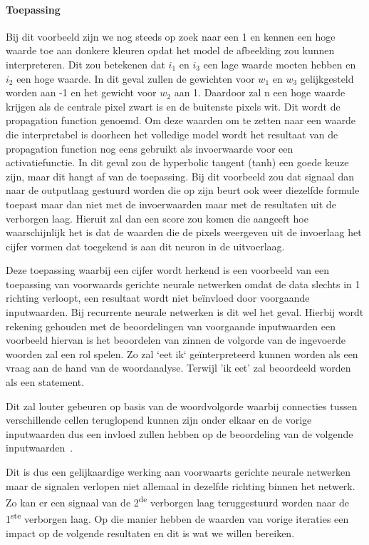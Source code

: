 \paragraph{Toepassing}
Bij dit voorbeeld zijn we nog steeds op zoek naar een 1 en kennen een hoge waarde toe aan donkere kleuren opdat het model de afbeelding zou kunnen interpreteren. Dit zou betekenen dat $i_1$ en $i_3$ een lage waarde moeten hebben en $i_2$ een hoge waarde. In dit geval zullen de gewichten voor $w_1$ en $w_3$ gelijkgesteld worden aan -1 en het gewicht voor $w_2$ aan 1. Daardoor zal n een hoge waarde krijgen als de centrale pixel zwart is en de buitenste pixels wit. Dit wordt de propagation function genoemd. Om deze waarden om te zetten naar een waarde die interpretabel is doorheen het volledige model wordt het resultaat van de propagation function nog eens gebruikt als invoerwaarde voor een activatiefunctie. In dit geval zou de hyperbolic tangent (tanh) een goede keuze zijn, maar dit hangt af van de toepassing.
Bij dit voorbeeld zou dat signaal dan naar de outputlaag gestuurd worden die op zijn beurt ook weer diezelfde formule toepast maar dan niet met de invoerwaarden maar met de resultaten uit de verborgen laag. Hieruit zal dan een score zou komen die aangeeft hoe waarschijnlijk het is dat de waarden die de pixels weergeven uit de invoerlaag het cijfer vormen dat toegekend is aan dit neuron in de uitvoerlaag. 

Deze toepassing waarbij een cijfer wordt herkend is een voorbeeld van een toepassing van voorwaards gerichte neurale netwerken omdat de data slechts in 1 richting verloopt, een resultaat wordt niet be\"{i}nvloed door voorgaande inputwaarden. Bij recurrente neurale netwerken is dit wel het geval. Hierbij wordt rekening gehouden met de beoordelingen van voorgaande inputwaarden een voorbeeld hiervan is het beoordelen van zinnen de volgorde van de ingevoerde woorden zal een rol spelen. Zo zal `eet ik` ge\"{i}nterpreteerd kunnen worden als een vraag aan de hand van de woordanalyse. Terwijl 'ik eet' zal beoordeeld worden als een statement. 

Dit zal louter gebeuren op basis van de woordvolgorde waarbij connecties tussen verschillende cellen teruglopend kunnen zijn onder elkaar en de vorige inputwaarden dus een invloed zullen hebben op de beoordeling van de volgende inputwaarden~\autocite{Lievens2018a}.

Dit is dus een gelijkaardige werking aan voorwaarts gerichte neurale netwerken maar de signalen verlopen niet allemaal in dezelfde richting binnen het netwerk. Zo kan er een signaal van de 2\textsuperscript{de} verborgen laag teruggestuurd worden naar de 1\textsuperscript{ste} verborgen laag. Op die manier hebben de waarden van vorige iteraties een impact op de volgende resultaten en dit is wat we willen bereiken. 

